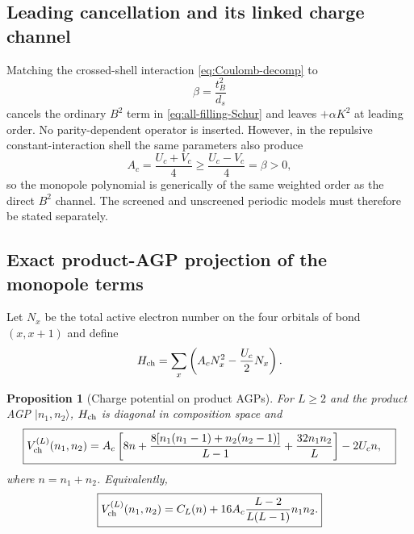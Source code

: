 \documentclass[11pt]{article}
\newtheorem{proposition}[theorem]{Proposition}
\theoremstyle{definition}
\theoremstyle{remark}
\newcommand{\ket}[1]{\lvert #1\rangle}
\begin{document}
\subsection{Leading cancellation and its linked charge channel}

Matching the crossed-shell interaction \eqref{eq:Coulomb-decomp} to
\begin{equation}
 \beta=\frac{t_B^2}{d_s}
 \label{eq:beta-match}
\end{equation}
cancels the ordinary $B^2$ term in \eqref{eq:all-filling-Schur} and leaves $+\alpha K^2$ at leading order.  No parity-dependent operator is inserted.  However, in the repulsive constant-interaction shell the same parameters also produce
\begin{equation}
 A_c=\frac{U_c+V_c}{4}\ge\frac{U_c-V_c}{4}=\beta>0,
 \label{eq:A-beta-link}
\end{equation}
so the monopole polynomial is generically of the same weighted order as the direct $B^2$ channel.  The screened and unscreened periodic models must therefore be stated separately.

\subsection{Exact product-AGP projection of the monopole terms}

Let $N_x$ be the total active electron number on the four orbitals of bond $(x,x+1)$ and define
\begin{equation}
 H_{\rm ch}=\sum_x\left(A_cN_x^2-\frac{U_c}{2}N_x\right).
\end{equation}

\begin{proposition}[Charge potential on product AGPs]
\label{prop:charge-potential}
For $L\ge2$ and the product AGP $\ket{n_1,n_2}$, $H_{\rm ch}$ is diagonal in composition space and
\begin{equation}
\boxed{
\begin{aligned}
 V_{\rm ch}^{(L)}(n_1,n_2)={}&A_c\left[
 8n+\frac{8[n_1(n_1-1)+n_2(n_2-1)]}{L-1}
 +\frac{32n_1n_2}{L}\right]-2U_cn,
\end{aligned}}
\label{eq:charge-potential}
\end{equation}
where $n=n_1+n_2$.  Equivalently,
\begin{equation}
 \boxed{V_{\rm ch}^{(L)}(n_1,n_2)=C_L(n)+16A_c\frac{L-2}{L(L-1)}n_1n_2.}
 \label{eq:charge-selector}
\end{equation}
\end{proposition}
\end{document}
